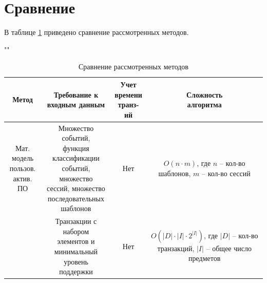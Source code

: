 

\section{Сравнение}

В таблице \ref{tab} приведено сравнение рассмотренных методов.

\begin{table}[H]
	\begin{center}
		\caption{Сравнение рассмотренных методов}
		\label{tab}
		""\newline
		\begin{tabular}{ | c | c | c | c | }
			\hline
			Метод & \specialcell{Требование к\\ входным данным}  & \specialcell{Учет\\времени \\транз-ий} & \specialcell{Сложность\\алгоритма} \\ \hline
			
			\specialcell{Мат. модель\\пользов.\\актив. ПО} & \specialcell{Множество событий,\\функция классификации\\событий, множество\\сессий, множество\\последовательных\\шаблонов} & Нет & \specialcell{$O(n \cdot m)$, где $n$ --\\кол-во шаблонов,\\$m$ -- кол-во сессий} \\ \hline
			
			\specialcell{Apriori} & \specialcell{Транзакции с набором\\элементов и\\минимальный уровень\\поддержки} & Нет & \specialcell{$O(|D| \cdot |I| \cdot 2^{|I|})$,\\где $|D|$ -- кол-во\\транзакций,\\$|I|$ -- общее число\\предметов} \\ \hline
			

\end{tabular}
\end{center}
\end{table}
